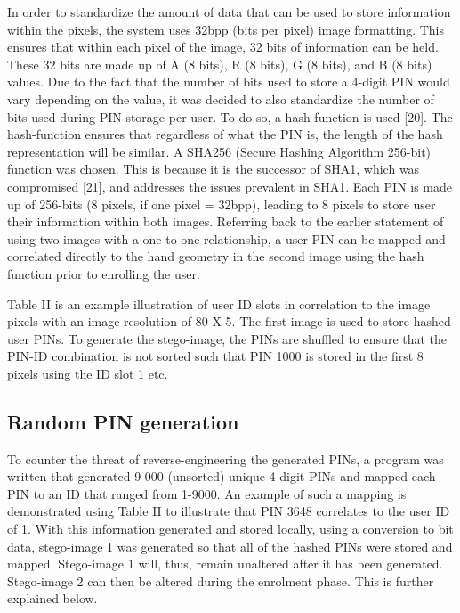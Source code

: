 
In order to standardize the amount of data that can be used to store information within the pixels, the system uses 32bpp (bits per pixel) image formatting. This ensures that within each pixel of the image, 32 bits of information can be held. These 32 bits are made up of A (8 bits), R (8 bits), G (8 bits), and B (8 bits) values. Due to the fact that the number of bits used to store a 4-digit PIN would vary depending on the value, it was decided to also standardize the number of bits used during PIN storage per user. To do so, a hash-function is used [20]. 
The hash-function ensures that regardless of what the PIN is, the length of the hash representation will be similar. A SHA256 (Secure Hashing Algorithm 256-bit) function was chosen. This is because it is the successor of SHA1, which was compromised [21], and addresses the issues prevalent in SHA1.
Each PIN is made up of 256-bits (8 pixels, if one pixel = 32bpp), leading to 8 pixels to store user their information within both images. Referring back to the earlier statement of using two images with a one-to-one relationship, a user PIN can be mapped and correlated directly to the hand geometry in the second image using the hash function prior to enrolling the user.

Table II is an example illustration of user ID slots in correlation to the image pixels with an image resolution of 80 X 5. The first image is used to store hashed user PINs. 
To generate the stego-image, the PINs are shuffled to ensure that the PIN-ID combination is not sorted such that PIN 1000 is stored in the first 8 pixels using the ID slot 1 etc.

\subsection{Random PIN generation}

To counter the threat of reverse-engineering the generated PINs, a program was written that generated 9 000 (unsorted) unique 4-digit PINs and mapped each PIN to an ID that ranged from 1-9000. An example of such a mapping is demonstrated using Table II to illustrate that PIN 3648 correlates to the user ID of 1. With this information generated and stored locally, using a conversion to bit data, stego-image 1 was generated so that all of the hashed PINs were stored and mapped. Stego-image 1 will, thus, remain unaltered after it has been generated. Stego-image 2 can then be altered during the enrolment phase. This is further explained below.

